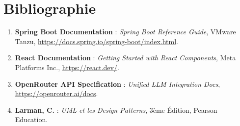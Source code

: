 \documentclass[12pt,a4paper,oneside]{report}
\begin{document}
\chapter*{Bibliographie}

\begin{enumerate}
    \item \textbf{Spring Boot Documentation} : \textit{Spring Boot Reference Guide}, VMware Tanzu, \url{https://docs.spring.io/spring-boot/index.html}.
    \item \textbf{React Documentation} : \textit{Getting Started with React Components}, Meta Platforms Inc., \url{https://react.dev/}.
    \item \textbf{OpenRouter API Specification} : \textit{Unified LLM Integration Docs}, \url{https://openrouter.ai/docs}.
    \item \textbf{Larman, C.} : \textit{UML et les Design Patterns}, 3ème Édition, Pearson Education.
\end{enumerate}
\end{document}
